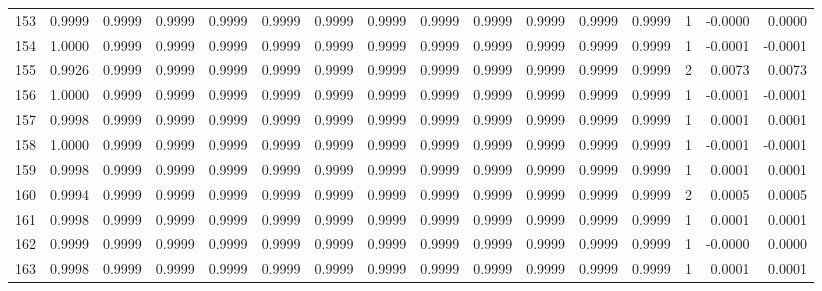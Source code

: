 \begin{tabular}{lrrrrrrrrrrrrrrr}
153 &      0.9999 &  0.9999 &  0.9999 &  0.9999 &  0.9999 &  0.9999 &  0.9999 &  0.9999 &  0.9999 &  0.9999 &   0.9999 &     0.9999 &      1 &                   -0.0000 &                     0.0000 \\
154 &      1.0000 &  0.9999 &  0.9999 &  0.9999 &  0.9999 &  0.9999 &  0.9999 &  0.9999 &  0.9999 &  0.9999 &   0.9999 &     0.9999 &      1 &                   -0.0001 &                    -0.0001 \\
155 &      0.9926 &  0.9999 &  0.9999 &  0.9999 &  0.9999 &  0.9999 &  0.9999 &  0.9999 &  0.9999 &  0.9999 &   0.9999 &     0.9999 &      2 &                    0.0073 &                     0.0073 \\
156 &      1.0000 &  0.9999 &  0.9999 &  0.9999 &  0.9999 &  0.9999 &  0.9999 &  0.9999 &  0.9999 &  0.9999 &   0.9999 &     0.9999 &      1 &                   -0.0001 &                    -0.0001 \\
157 &      0.9998 &  0.9999 &  0.9999 &  0.9999 &  0.9999 &  0.9999 &  0.9999 &  0.9999 &  0.9999 &  0.9999 &   0.9999 &     0.9999 &      1 &                    0.0001 &                     0.0001 \\
158 &      1.0000 &  0.9999 &  0.9999 &  0.9999 &  0.9999 &  0.9999 &  0.9999 &  0.9999 &  0.9999 &  0.9999 &   0.9999 &     0.9999 &      1 &                   -0.0001 &                    -0.0001 \\
159 &      0.9998 &  0.9999 &  0.9999 &  0.9999 &  0.9999 &  0.9999 &  0.9999 &  0.9999 &  0.9999 &  0.9999 &   0.9999 &     0.9999 &      1 &                    0.0001 &                     0.0001 \\
160 &      0.9994 &  0.9999 &  0.9999 &  0.9999 &  0.9999 &  0.9999 &  0.9999 &  0.9999 &  0.9999 &  0.9999 &   0.9999 &     0.9999 &      2 &                    0.0005 &                     0.0005 \\
161 &      0.9998 &  0.9999 &  0.9999 &  0.9999 &  0.9999 &  0.9999 &  0.9999 &  0.9999 &  0.9999 &  0.9999 &   0.9999 &     0.9999 &      1 &                    0.0001 &                     0.0001 \\
162 &      0.9999 &  0.9999 &  0.9999 &  0.9999 &  0.9999 &  0.9999 &  0.9999 &  0.9999 &  0.9999 &  0.9999 &   0.9999 &     0.9999 &      1 &                   -0.0000 &                     0.0000 \\
163 &      0.9998 &  0.9999 &  0.9999 &  0.9999 &  0.9999 &  0.9999 &  0.9999 &  0.9999 &  0.9999 &  0.9999 &   0.9999 &     0.9999 &      1 &                    0.0001 &                     0.0001 \\

\end{tabular}
